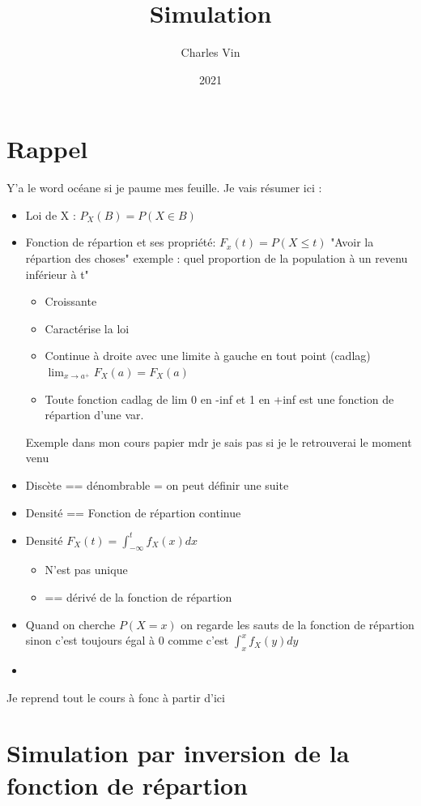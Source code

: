 \documentclass{article}
\title{Simulation}
\author{Charles Vin}
\date{2021}
\theoremstyle{plain}%
\theoremstyle{definition}
\theoremstyle{remark}
\begin{document}
\maketitle

\section{Rappel}
Y'a le word océane si je paume mes feuille. Je vais résumer ici : 
\begin{itemize}
    \item Loi de X : $ P_X(B) = P(X \in B) $ 
    \item Fonction de répartion et ses propriété: $ F_x(t) = P(X \leq t) $  "Avoir la répartion des choses" exemple : quel proportion de la population à un revenu inférieur à t" \begin{itemize}
        \item Croissante 
        \item Caractérise la loi 
        \item Continue à droite avec une limite à gauche en tout point  (cadlag) $ \lim_{x \to a^+} F_X(a) = F_X(a) $ 
        \item Toute fonction cadlag de lim 0 en -inf et 1 en +inf est une fonction de répartion d'une var.
    \end{itemize}
    Exemple dans mon cours papier mdr je sais pas si je le retrouverai le moment venu
    \item Discète == dénombrable = on peut définir une suite
    \item Densité == Fonction de répartion continue
    \item Densité $ F_X (t) = \int_{-\infty }^{t}f_X(x)dx $  \begin{itemize}
        \item N'est pas unique
        \item == dérivé de la fonction de répartion
    \end{itemize}
    \item Quand on cherche $ P(X=x) $ on regarde les sauts de la fonction de répartion sinon c'est toujours égal à 0 comme c'est $ \int_{x}^{x}f_X(y)dy$
    \item 
\end{itemize}
Je reprend tout le cours à fonc à partir d'ici

\section{Simulation par inversion de la fonction de répartion}
\end{document}
